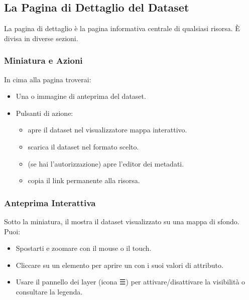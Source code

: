 \documentclass[letterpaper,10pt,english]{sphinxmanual}
\begin{document}
\subsection{La Pagina di Dettaglio del Dataset}
\label{\detokenize{it/02_trovare_visualizzare:la-pagina-di-dettaglio-del-dataset}}
\sphinxAtStartPar
La pagina di dettaglio è la pagina informativa centrale di qualsiasi risorsa. È divisa
in diverse sezioni.


\subsubsection{Miniatura e Azioni}
\label{\detokenize{it/02_trovare_visualizzare:miniatura-e-azioni}}
\sphinxAtStartPar
In cima alla pagina troverai:
\begin{itemize}
\item {} 
\sphinxAtStartPar
Una  o immagine di anteprima del dataset.

\item {} 
\sphinxAtStartPar
Pulsanti di azione:
\begin{itemize}
\item {} 
\sphinxAtStartPar
{} \textendash{} apre il dataset nel visualizzatore mappa interattivo.

\item {} 
\sphinxAtStartPar
{} \textendash{} scarica il dataset nel formato scelto.

\item {} 
\sphinxAtStartPar
{} (se hai l’autorizzazione) \textendash{} apre l’editor dei metadati.

\item {} 
\sphinxAtStartPar
{} \textendash{} copia il link permanente alla risorsa.

\end{itemize}

\end{itemize}


\subsubsection{Anteprima Interattiva}
\label{\detokenize{it/02_trovare_visualizzare:anteprima-interattiva}}
\sphinxAtStartPar
Sotto la miniatura, il  mostra il dataset visualizzato
su una mappa di sfondo. Puoi:
\begin{itemize}
\item {} 
\sphinxAtStartPar
Spostarti e zoomare con il mouse o il touch.

\item {} 
\sphinxAtStartPar
Cliccare su un elemento per aprire un  con i suoi valori di attributo.

\item {} 
\sphinxAtStartPar
Usare il pannello dei layer (icona ☰) per attivare/disattivare la visibilità o
consultare la legenda.

\end{itemize}
\end{document}
